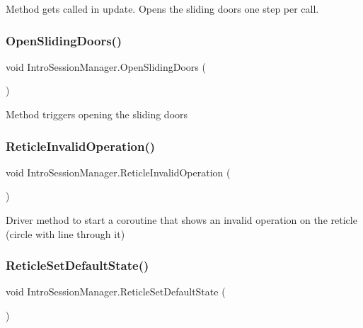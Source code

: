 Method gets called in update. Opens the sliding doors one step per call. 

\mbox{\label{class_intro_session_manager_ab0c0444fb1525d86b4187c32cec0ce42}} 
\subsubsection{\texorpdfstring{Open\+Sliding\+Doors()}{OpenSlidingDoors()}}
{\footnotesize\ttfamily void Intro\+Session\+Manager.\+Open\+Sliding\+Doors (\begin{DoxyParamCaption}{ }\end{DoxyParamCaption})}



Method triggers opening the sliding doors 

\mbox{\label{class_intro_session_manager_a7ecdbb5df14f9c17bd6556467916f4aa}} 
\subsubsection{\texorpdfstring{Reticle\+Invalid\+Operation()}{ReticleInvalidOperation()}}
{\footnotesize\ttfamily void Intro\+Session\+Manager.\+Reticle\+Invalid\+Operation (\begin{DoxyParamCaption}{ }\end{DoxyParamCaption})}



Driver method to start a coroutine that shows an invalid operation on the reticle (circle with line through it) 

\mbox{\label{class_intro_session_manager_a2c3b7ee11852a65be6fb794c84de14f5}} 
\subsubsection{\texorpdfstring{Reticle\+Set\+Default\+State()}{ReticleSetDefaultState()}}
{\footnotesize\ttfamily void Intro\+Session\+Manager.\+Reticle\+Set\+Default\+State (\begin{DoxyParamCaption}{ }\end{DoxyParamCaption})}



